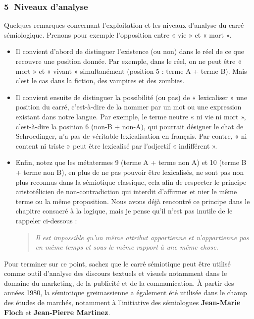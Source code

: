 \subsubsection*{\textcircled{\scriptsize 5} Niveaux d’analyse}
Quelques remarques concernant l’exploitation et les niveaux d’analyse du carré sémiologique. Prenons pour exemple l’opposition entre « vie » et « mort ».
\begin{itemize}
\item Il convient d’abord de distinguer l’existence (ou non) dans le réel de ce que recouvre une position donnée. Par exemple, dans le réel, on ne peut être « mort » et « vivant » simultanément (position 5 : terme A + terme B). Mais c’est le cas dans la fiction, des vampires et des zombies.
\item Il convient ensuite de distinguer la possibilité (ou pas) de « lexicaliser » une position du carré, c’est-à-dire de la nommer par un mot ou une expression existant dans notre langue. Par exemple, le terme neutre « ni vie ni mort », c’est-à-dire la position 6 (non-B + non-A), qui pourrait désigner le chat de Schroedinger, n’a pas de véritable lexicalisation en français. Par contre, « ni content ni triste » peut être lexicalisé par l’adjectif « indifférent ».
\item Enfin, notez que les métatermes 9 (terme A + terme non A) et 10 (terme B + terme non B), en plus de ne pas pouvoir être lexicalisés, ne sont pas non plus reconnus dans la sémiotique classique, cela afin de respecter le principe aristotélicien de non-contradiction qui interdit d’affirmer et nier le même terme ou la même proposition. Nous avons déjà rencontré ce principe dans le chapitre consacré à la logique, mais je pense qu’il n’est pas inutile de le rappeler ci-dessous :
\begin{quote}\small\itshape
Il est impossible qu’un même attribut appartienne et n’appartienne pas en même temps et sous le même rapport à une même chose.
\end{quote}
\end{itemize}
Pour terminer sur ce point, sachez que le carré sémiotique peut être utilisé comme outil d’analyse des discours textuels et visuels notamment dans le domaine du marketing, de la publicité et de la communication. À partir des années 1980, la sémiotique greimassienne a également été utilisée dans le champ des études de marchés, notamment à l’initiative des sémiologues \textbf{Jean-Marie Floch} et \textbf{Jean-Pierre Martinez}.

